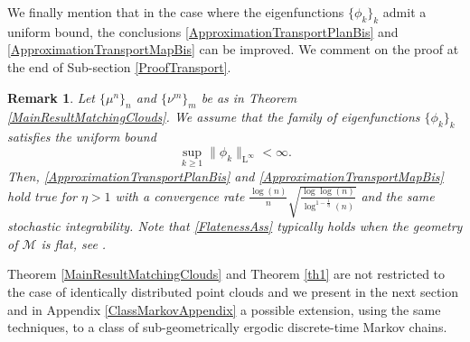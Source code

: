 \documentclass[11pt,a4paper,oneside]{amsart}
\numberwithin{equation}{section}
\newtheorem{remark}[theorem]{Remark}
\newcommand{\LL}{\mathrm{L}}
\begin{document}
%
We finally mention that in the case where the eigenfunctions $\{\phi_k\}_{k}$ admit a uniform bound, the conclusions \eqref{ApproximationTransportPlanBis} and \eqref{ApproximationTransportMapBis} can be improved. We comment on the proof at the end of Sub-section \ref{ProofTransport}.
%
\begin{remark}\label{FlatGeometry}
%
Let $\{\mu^n\}_n$ and $\{\nu^m\}_m$ be as in Theorem \ref{MainResultMatchingClouds}. We assume that the family of eigenfunctions $\{\phi_k\}_k$ satisfies the uniform bound
%
\begin{equation}\label{FlatenessAss}
%
\sup_{k\geq 1}\|\phi_k\|_{\LL^\infty}<\infty.
%
\end{equation}
%
Then, \eqref{ApproximationTransportPlanBis} and \eqref{ApproximationTransportMapBis} hold true for $\eta>1$ with a convergence rate $\frac{\log(n)}{n}\sqrt{\frac{\log\log(n)}{\log^{1-\frac{1}{\eta}}(n)}}$ and the same stochastic integrability. Note that \eqref{FlatenessAss} typically holds when the geometry of $\mathcal{M}$ is flat, see \cite{toth2002riemannian}.
%
\end{remark}




%
\medskip
%

Theorem \ref{MainResultMatchingClouds} and Theorem \ref{th1} are not restricted to the case of identically distributed point clouds and we present in the next section and in Appendix \ref{ClassMarkovAppendix} a possible extension, using the same techniques, to a class of sub-geometrically ergodic discrete-time Markov chains.
\end{document}
